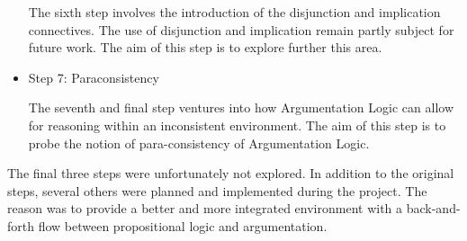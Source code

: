 \documentclass[11pt,twoside,a4paper]{report}
\begin{document}
\begin{itemize}
The sixth step involves the introduction of the disjunction and implication connectives. The use of disjunction and implication remain partly subject for future work. The aim of this step is to explore further this area.
\item
Step 7: Paraconsistency

The seventh and final step ventures into how Argumentation Logic can allow for reasoning within an inconsistent environment. The aim of this step is to probe the notion of para-consistency of Argumentation Logic.
\end{itemize}

The final three steps were unfortunately not explored. In addition to the original steps, several others were planned and implemented during the project. The reason was to provide a better and more integrated environment with a back-and-forth flow between propositional logic and argumentation.
\end{document}

